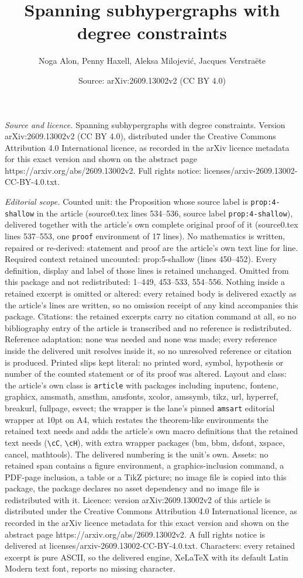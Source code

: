 \documentclass[10pt,a4paper]{amsart}
\title[Spanning subhypergraphs with degree constraints]{Spanning subhypergraphs with degree constraints}
\author{Noga Alon, Penny Haxell, Aleksa Milojevi\'c, Jacques Verstra\"ete}
\date{Source: arXiv:2609.13002v2 (CC BY 4.0)}
\begin{document}
\maketitle

\noindent\emph{Source and licence.} Spanning subhypergraphs with degree constraints. Version arXiv:2609.13002v2 (CC BY 4.0), distributed under the Creative Commons Attribution 4.0 International licence, as recorded in the arXiv licence metadata for this exact version and shown on the abstract page https://arxiv.org/abs/2609.13002v2. Full rights notice: licenses/arxiv-2609.13002-CC-BY-4.0.txt.\par\smallskip

\noindent\textit{Editorial scope.} Counted unit: the Proposition whose source label is \texttt{prop:4-shallow} in the article (source0.tex lines 534--536, source label \texttt{prop:4-shallow}), delivered together with the article's own complete original proof of it (source0.tex lines 537--553, one \texttt{proof} environment of 17 lines). No mathematics is written, repaired or re-derived: statement and proof are the article's own text line for line. Required context retained uncounted: prop:5-shallow (lines 450--452). Every definition, display and label of those lines is retained unchanged. Omitted from this package and not redistributed: 1--449, 453--533, 554--556. Nothing inside a retained excerpt is omitted or altered: every retained body is delivered exactly as the article's lines are written, so no omission receipt of any kind accompanies this package. Citations: the retained excerpts carry no citation command at all, so no bibliography entry of the article is transcribed and no reference is redistributed. Reference adaptation: none was needed and none was made; every reference inside the delivered unit resolves inside it, so no unresolved reference or citation is produced. Printed slips kept literal: no printed word, symbol, hypothesis or number of the counted statement or of its proof was altered. Layout and class: the article's own class is \texttt{article} with packages including inputenc, fontenc, graphicx, amsmath, amsthm, amsfonts, xcolor, amssymb, tikz, url, hyperref, breakurl, fullpage, esvect; the wrapper is the lane's pinned \texttt{amsart} editorial wrapper at 10pt on A4, which restates the theorem-like environments the retained text needs and adds the article's own macro definitions that the retained text needs (\texttt{\textbackslash cC}, \texttt{\textbackslash cH}), with extra wrapper packages (bm, bbm, dsfont, xspace, cancel, mathtools). The delivered numbering is the unit's own. Assets: no retained span contains a figure environment, a graphics-inclusion command, a PDF-page inclusion, a table or a TikZ picture; no image file is copied into this package, the package declares no asset dependency and no image file is redistributed with it. Licence: version arXiv:2609.13002v2 of this article is distributed under the Creative Commons Attribution 4.0 International licence, as recorded in the arXiv licence metadata for this exact version and shown on the abstract page https://arxiv.org/abs/2609.13002v2. A full rights notice is delivered at licenses/arxiv-2609.13002-CC-BY-4.0.txt. Characters: every retained excerpt is pure ASCII, so the delivered engine, XeLaTeX with its default Latin Modern text font, reports no missing character.
\end{document}
